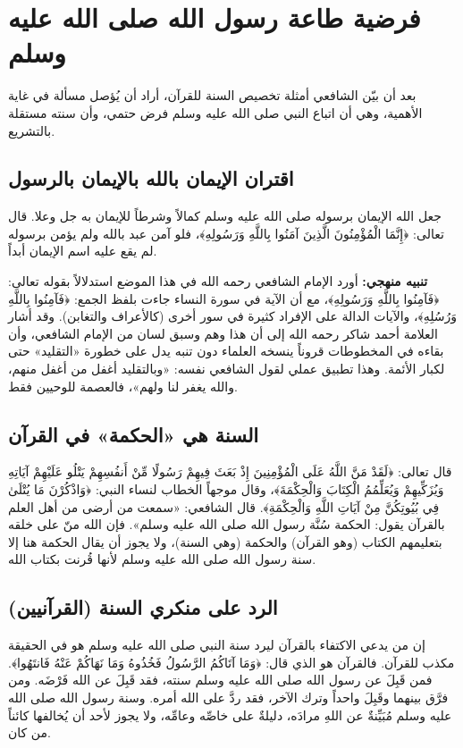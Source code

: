 \section{فرضية طاعة رسول الله صلى الله عليه وسلم}
بعد أن بيّن الشافعي أمثلة تخصيص السنة للقرآن، أراد أن يُؤصل مسألة في غاية الأهمية، وهي أن اتباع النبي صلى الله عليه وسلم فرض حتمي، وأن سنته مستقلة بالتشريع.

\subsection{اقتران الإيمان بالله بالإيمان بالرسول}
جعل الله الإيمان برسوله صلى الله عليه وسلم كمالاً وشرطاً للإيمان به جل وعلا. قال تعالى: ﴿إِنَّمَا الْمُؤْمِنُونَ الَّذِينَ آمَنُوا بِاللَّهِ وَرَسُولِهِ﴾، فلو آمن عبد بالله ولم يؤمن برسوله لم يقع عليه اسم الإيمان أبداً.

\textbf{تنبيه منهجي:} أورد الإمام الشافعي رحمه الله في هذا الموضع استدلالاً بقوله تعالى: ﴿فَآمِنُوا بِاللَّهِ وَرَسُولِهِ﴾، مع أن الآية في سورة النساء جاءت بلفظ الجمع: ﴿فَآمِنُوا بِاللَّهِ وَرُسُلِهِ﴾، والآيات الدالة على الإفراد كثيرة في سور أخرى (كالأعراف والتغابن). وقد أشار العلامة أحمد شاكر رحمه الله إلى أن هذا وهم وسبق لسان من الإمام الشافعي، وأن بقاءه في المخطوطات قروناً ينسخه العلماء دون تنبه يدل على خطورة «التقليد» حتى لكبار الأئمة. وهذا تطبيق عملي لقول الشافعي نفسه: «وبالتقليد أغفل من أغفل منهم، والله يغفر لنا ولهم»، فالعصمة للوحيين فقط.

\subsection{السنة هي «الحكمة» في القرآن}
قال تعالى: ﴿لَقَدْ مَنَّ اللَّهُ عَلَى الْمُؤْمِنِينَ إِذْ بَعَثَ فِيهِمْ رَسُولًا مِّنْ أَنفُسِهِمْ يَتْلُو عَلَيْهِمْ آيَاتِهِ وَيُزَكِّيهِمْ وَيُعَلِّمُمُ الْكِتَابَ وَالْحِكْمَةَ﴾، وقال موجهاً الخطاب لنساء النبي: ﴿وَاذْكُرْنَ مَا يُتْلَىٰ فِي بُيُوتِكُنَّ مِنْ آيَاتِ اللَّهِ وَالْحِكْمَةِ﴾.
قال الشافعي: «سمعت من أرضى من أهل العلم بالقرآن يقول: الحكمة سُنَّة رسول الله صلى الله عليه وسلم». فإن الله منّ على خلقه بتعليمهم الكتاب (وهو القرآن) والحكمة (وهي السنة)، ولا يجوز أن يقال الحكمة هنا إلا سنة رسول الله صلى الله عليه وسلم لأنها قُرنت بكتاب الله.

\subsection{الرد على منكري السنة (القرآنيين)}
إن من يدعي الاكتفاء بالقرآن ليرد سنة النبي صلى الله عليه وسلم هو في الحقيقة مكذب للقرآن. فالقرآن هو الذي قال: ﴿وَمَا آتَاكُمُ الرَّسُولُ فَخُذُوهُ وَمَا نَهَاكُمْ عَنْهُ فَانتَهُوا﴾.
فمن قَبِلَ عن رسول الله صلى الله عليه وسلم سنته، فقد قَبِلَ عن الله فَرْضَه. ومن فرَّق بينهما وقَبِلَ واحداً وترك الآخر، فقد ردَّ على الله أمره. وسنة رسول الله صلى الله عليه وسلم مُبَيِّنةٌ عن اللهِ مرادَه، دليلةٌ على خاصِّه وعامِّه، ولا يجوز لأحد أن يُخالفها كائناً من كان.